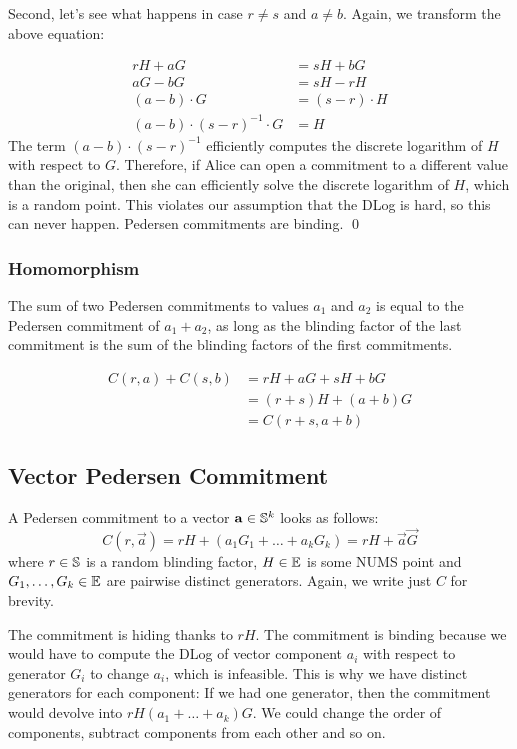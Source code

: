 Second, let's see what happens in case $r \neq s$ and $a \neq b$.
Again, we transform the above equation:

\begin{align*}
    rH + aG &= sH + bG\\
    aG - bG &= sH - rH\\
    (a - b)\cdot G &= (s - r) \cdot H\\
    (a - b) \cdot (s - r)^{-1} \cdot G &= H
\end{align*}
%
The term $(a - b) \cdot (s - r)^{-1}$ efficiently computes the discrete logarithm of $H$ with respect to $G$.
Therefore, if Alice can open a commitment to a different value than the original,
then she can efficiently solve the discrete logarithm of $H$, which is a random point.
This violates our assumption that the DLog is hard, so this can never happen.
Pedersen commitments are binding. \qed

\subsubsection{Homomorphism}

The sum of two Pedersen commitments to values $a_1$ and $a_2$
is equal to the Pedersen commitment of $a_1 + a_2$,
as long as the blinding factor of the last commitment is the sum of the blinding factors of the first commitments.

\begin{align*}
    C(r, a) + C(s, b)
    &= rH + aG + sH + bG \\
    &= (r + s)H + (a + b)G \\
    &= C(r + s, a + b)
\end{align*}

\subsection{Vector Pedersen Commitment}

A Pedersen commitment to a vector $\mathbf{a} \in \mathbb{S}^k$ looks as follows:
\[
    C(r, \vec{a}) = rH + (a_1G_1 + \ldots + a_kG_k) = rH + \Vec{a}\vec{G}
\]
where $r \in \mathbb{S}$ is a random blinding factor,
$H \in \mathbb{E}$ is some NUMS point
and $G_1, \ldots, G_k \in \mathbb{E}$ are pairwise distinct generators.
Again, we write just $C$ for brevity.

The commitment is hiding thanks to $rH$.
The commitment is binding because we would have to compute the DLog of vector component $a_i$ with respect to generator $G_i$ to change $a_i$, which is infeasible.
This is why we have distinct generators for each component:
If we had one generator, then the commitment would devolve into $rH(a_1 + \ldots + a_k)G$.
We could change the order of components, subtract components from each other and so on.


